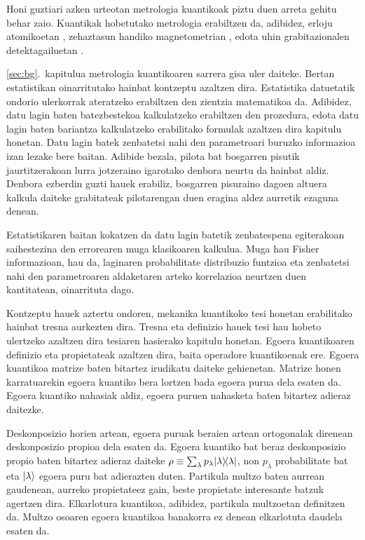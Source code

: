 Honi guztiari azken urteotan metrologia kuantikoak piztu duen arreta gehitu behar zaio.
Kuantikak hobetutako metrologia erabiltzen da, adibidez, erloju atomikoetan \cite{Louchet-Chauvet2010, Borregaard2013, Kessler2014a}, zehaztasun handiko magnetometrian \cite{Wasilewski2010, Eckert2006, Wildermuth2006, Wolfgramm2010, Koschorreck2011, Vengalattore2007, Zhou2010}, edota uhin grabitazionalen detektagailuetan \cite{Schnabel2010, TheLIGOScientificCollaboration2011, Demkowicz-Dobrzanski2013}.

\ref{sec:bg}.~kapitulua metrologia kuantikoaren sarrera gisa uler daiteke.
Bertan estatistikan oinarritutako hainbat kontzeptu azaltzen dira.
Estatistika datuetatik ondorio ulerkorrak ateratzeko erabiltzen den zientzia matematikoa da.
Adibidez, datu lagin baten batezbestekoa kalkulatzeko erabiltzen den prozedura,
edota datu lagin baten bariantza kalkulatzeko erabilitako formulak azaltzen dira kapitulu honetan.
Datu lagin batek zenbatetsi nahi den parametroari buruzko informazioa izan lezake bere baitan.
Adibide bezala, pilota bat bosgarren pisutik jaurtitzerakoan lurra jotzeraino igarotako denbora neurtu da hainbat aldiz.
Denbora ezberdin guzti hauek erabiliz, bosgarren pisuraino dagoen altuera kalkula daiteke grabitateak pilotarengan duen eragina aldez aurretik ezaguna denean.

Estatistikaren baitan kokatzen da datu lagin batetik zenbatespena egiterakoan saihestezina den errorearen muga klasikoaren kalkulua.
Muga hau Fisher informazioan, hau da, laginaren probabilitate distribuzio funtzioa eta zenbatetsi nahi den parametroaren aldaketaren arteko korrelazioa neurtzen duen kantitatean, oinarrituta dago.

Kontzeptu hauek aztertu ondoren, mekanika kuantikoko tesi honetan erabilitako hainbat tresna aurkezten dira.
Tresna eta definizio hauek tesi hau hobeto ulertzeko azaltzen dira tesiaren hasierako kapitulu honetan.
Egoera kuantikoaren definizio eta propietateak azaltzen dira, baita operadore kuantikoenak ere.
Egoera kuantikoa matrize baten bitartez irudikatu daiteke gehienetan.
Matrize honen karratuarekin egoera kuantiko bera lortzen bada egoera purua dela esaten da.
Egoera kuantiko nahasiak aldiz, egoera puruen nahasketa baten bitartez adieraz daitezke.

Deskonposizio horien artean, egoera puruak beraien artean ortogonalak direnean deskonposizio propioa dela esaten da.
Egoera kuantiko bat beraz deskonposizio propio baten bitartez adieraz daiteke $\rho\equiv\sum_\lambda p_\lambda \vert{\lambda}\rangle{\!}\langle{\lambda}\vert$, non $p_\lambda$ probabilitate bat eta $\vert{\lambda}\rangle$ egoera puru bat adierazten duten.
Partikula multzo baten aurrean gaudenean, aurreko propietateez gain, beste propietate interesante batzuk agertzen dira.
Elkarlotura kuantikoa, adibidez, partikula multzoetan definitzen da.
Multzo osoaren egoera kuantikoa banakorra ez denean elkarlotuta daudela esaten da.

